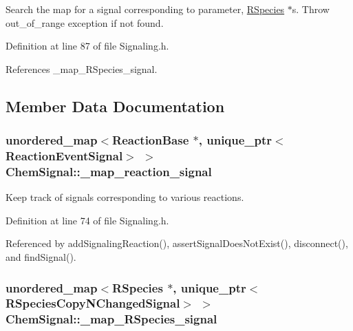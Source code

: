 Search the map for a signal corresponding to parameter, \hyperlink{classRSpecies}{R\+Species} $\ast$s. Throw out\+\_\+of\+\_\+range exception if not found. 



Definition at line 87 of file Signaling.\+h.



References \+\_\+map\+\_\+\+R\+Species\+\_\+signal.



\subsection{Member Data Documentation}
\hypertarget{classChemSignal_a750129c5a876c652e76e2a008b21b276}{
\subsubsection[{\+\_\+map\+\_\+reaction\+\_\+signal}]{\setlength{\rightskip}{0pt plus 5cm}unordered\+\_\+map$<${\bf Reaction\+Base} $\ast$, unique\+\_\+ptr$<${\bf Reaction\+Event\+Signal}$>$ $>$ Chem\+Signal\+::\+\_\+map\+\_\+reaction\+\_\+signal\hspace{0.3cm}{\ttfamily [private]}}}\label{classChemSignal_a750129c5a876c652e76e2a008b21b276}


Keep track of signals corresponding to various reactions. 



Definition at line 74 of file Signaling.\+h.



Referenced by add\+Signaling\+Reaction(), assert\+Signal\+Does\+Not\+Exist(), disconnect(), and find\+Signal().

\hypertarget{classChemSignal_a01513b0756cb765b0fd02a7e5497133d}{
\subsubsection[{\+\_\+map\+\_\+\+R\+Species\+\_\+signal}]{\setlength{\rightskip}{0pt plus 5cm}unordered\+\_\+map$<${\bf R\+Species} $\ast$, unique\+\_\+ptr$<${\bf R\+Species\+Copy\+N\+Changed\+Signal}$>$ $>$ Chem\+Signal\+::\+\_\+map\+\_\+\+R\+Species\+\_\+signal\hspace{0.3cm}{\ttfamily [private]}}}\label{classChemSignal_a01513b0756cb765b0fd02a7e5497133d}


